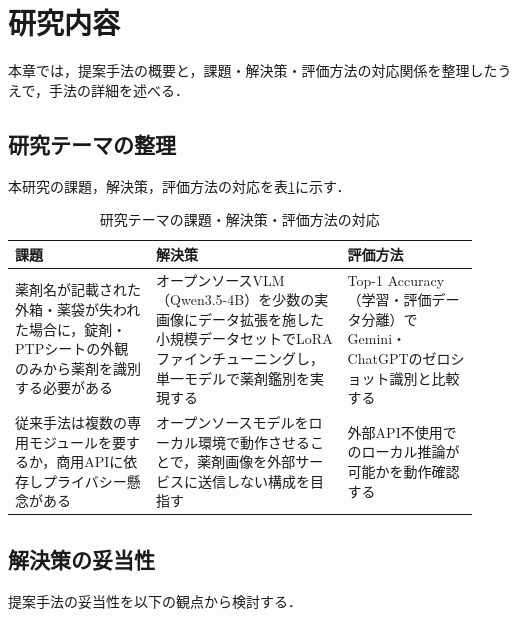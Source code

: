 \documentclass{ltjsarticle}
\begin{document}
\newpage

\section{研究内容}\label{sec3}

本章では，提案手法の概要と，課題・解決策・評価方法の対応関係を整理したうえで，手法の詳細を述べる．

\subsection{研究テーマの整理}

本研究の課題，解決策，評価方法の対応を表\ref{tab:theme}に示す．

\begin{table}[h]
\centering
\caption{研究テーマの課題・解決策・評価方法の対応}
\label{tab:theme}
\small
\setlength{\tabcolsep}{4pt}
\begin{tabular}{p{0.28\linewidth}p{0.38\linewidth}p{0.26\linewidth}}
\hline
課題 & 解決策 & 評価方法 \\
\hline
薬剤名が記載された外箱・薬袋が失われた場合に，錠剤・PTPシートの外観のみから薬剤を識別する必要がある &
オープンソースVLM（Qwen3.5-4B）を少数の実画像にデータ拡張を施した小規模データセットでLoRAファインチューニングし，単一モデルで薬剤鑑別を実現する &
Top-1 Accuracy（学習・評価データ分離）でGemini・ChatGPTのゼロショット識別と比較する \\
\hline
従来手法は複数の専用モジュールを要するか，商用APIに依存しプライバシー懸念がある &
オープンソースモデルをローカル環境で動作させることで，薬剤画像を外部サービスに送信しない構成を目指す &
外部API不使用でのローカル推論が可能かを動作確認する \\
\hline
\end{tabular}
\end{table}

\subsection{解決策の妥当性}

提案手法の妥当性を以下の観点から検討する．
\end{document}
